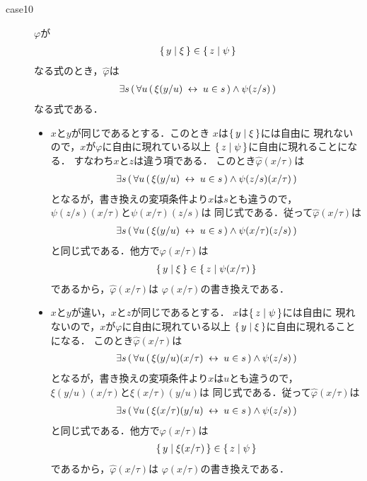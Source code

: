 \begin{metaprf}[第一]
\begin{description}
\begin{description}
					\item[case10] $\varphi$が
						\begin{align}
							\{\, y \mid \xi\, \} \in \{\, z \mid \psi\, \}
						\end{align}
						なる式のとき，$\widehat{\varphi}$は
						\begin{align}
							\exists s\, (\, \forall u\, (\, \xi(y/u) \hspace{0.25em}\leftrightarrow\hspace{0.25em} u \in s\, ) \wedge \psi(z/s)\, )
						\end{align}
						なる式である．
						\begin{itemize}
							\item $x$と$y$が同じであるとする．このとき
								$x$は$\{\, y \mid \xi\, \}$には自由に
								現れないので，$x$が$\varphi$に自由に現れている以上
								$\{\, z \mid \psi\, \}$に自由に現れることになる．
								すなわち$x$と$z$は違う項である．
								このとき$\widehat{\varphi}(x/\tau)$は
								\begin{align}
									\exists s\, (\, \forall u\, (\, \xi(y/u) \hspace{0.25em}\leftrightarrow\hspace{0.25em} u \in s\, ) \wedge \psi(z/s)(x/\tau)\, )
								\end{align}
								となるが，書き換えの変項条件より$x$は$s$とも違うので，
								$\psi(z/s)(x/\tau)$と$\psi(x/\tau)(z/s)$は
								同じ式である．従って$\widehat{\varphi}(x/\tau)$は
								\begin{align}
									\exists s\, (\, \forall u\, (\, \xi(y/u) \hspace{0.25em}\leftrightarrow\hspace{0.25em} u \in s\, ) \wedge \psi(x/\tau)(z/s)\, )
								\end{align}
								と同じ式である．他方で$\varphi(x/\tau)$は
								\begin{align}
									\{\, y \mid \xi\, \} \in \{\, z \mid \psi(x/\tau)\, \}
								\end{align}
								であるから，$\widehat{\varphi}(x/\tau)$は
								$\varphi(x/\tau)$の書き換えである．
								
							\item $x$と$y$が違い，$x$と$z$が同じであるとする．
								$x$は$\{\, z \mid \psi\, \}$には自由に
								現れないので，$x$が$\varphi$に自由に現れている以上
								$\{\, y \mid \xi\, \}$に自由に現れることになる．
								このとき$\widehat{\varphi}(x/\tau)$は
								\begin{align}
									\exists s\, (\, \forall u\, (\, \xi(y/u)(x/\tau) \hspace{0.25em}\leftrightarrow\hspace{0.25em} u \in s\, ) \wedge \psi(z/s)\, )
								\end{align}
								となるが，書き換えの変項条件より$x$は$u$とも違うので，
								$\xi(y/u)(x/\tau)$と$\xi(x/\tau)(y/u)$は
								同じ式である．従って$\widehat{\varphi}(x/\tau)$は
								\begin{align}
									\exists s\, (\, \forall u\, (\, \xi(x/\tau)(y/u) \hspace{0.25em}\leftrightarrow\hspace{0.25em} u \in s\, ) \wedge \psi(z/s)\, )
								\end{align}
								と同じ式である．他方で$\varphi(x/\tau)$は
								\begin{align}
									\{\, y \mid \xi(x/\tau)\, \} \in \{\, z \mid \psi\, \}
								\end{align}
								であるから，$\widehat{\varphi}(x/\tau)$は
								$\varphi(x/\tau)$の書き換えである．
								

\end{itemize}
\end{description}
\end{description}
\end{metaprf}
